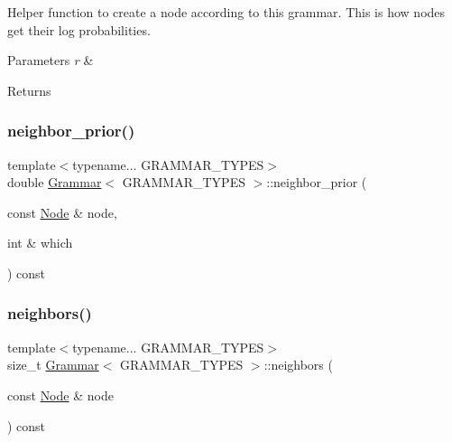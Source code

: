 Helper function to create a node according to this grammar. This is how nodes get their log probabilities. 
\begin{DoxyParams}{Parameters}
{\em r} & \\
\hline
\end{DoxyParams}
\begin{DoxyReturn}{Returns}

\end{DoxyReturn}
\mbox{\label{class_grammar_a36e6e5072b99611de47c4be3ab78761c}} 
\subsubsection{\texorpdfstring{neighbor\+\_\+prior()}{neighbor\_prior()}}
{\footnotesize\ttfamily template$<$typename... G\+R\+A\+M\+M\+A\+R\+\_\+\+T\+Y\+P\+ES$>$ \\
double \hyperlink{class_grammar}{Grammar}$<$ G\+R\+A\+M\+M\+A\+R\+\_\+\+T\+Y\+P\+ES $>$\+::neighbor\+\_\+prior (\begin{DoxyParamCaption}\item[{const \hyperlink{class_node}{Node} \&}]{node,  }\item[{int \&}]{which }\end{DoxyParamCaption}) const\hspace{0.3cm}{\ttfamily [inline]}}

\mbox{\label{class_grammar_a486cec3b8e6c757eb348031ff8118a99}} 
\subsubsection{\texorpdfstring{neighbors()}{neighbors()}}
{\footnotesize\ttfamily template$<$typename... G\+R\+A\+M\+M\+A\+R\+\_\+\+T\+Y\+P\+ES$>$ \\
size\+\_\+t \hyperlink{class_grammar}{Grammar}$<$ G\+R\+A\+M\+M\+A\+R\+\_\+\+T\+Y\+P\+ES $>$\+::neighbors (\begin{DoxyParamCaption}\item[{const \hyperlink{class_node}{Node} \&}]{node }\end{DoxyParamCaption}) const\hspace{0.3cm}{\ttfamily [inline]}}

